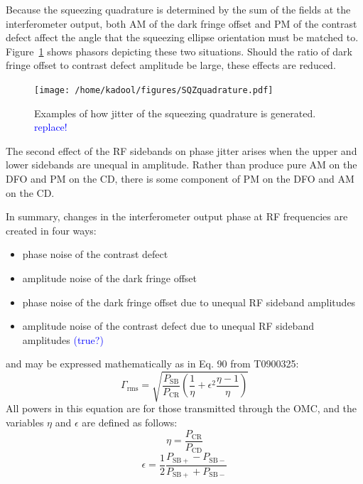 \documentclass{ligodoc}
\begin{document}
Because the squeezing quadrature is determined by the sum of the
fields at the interferometer output, both AM of the dark fringe offset
and PM of the contrast defect affect the angle that the squeezing
ellipse orientation must be matched to. Figure~\ref{fig:sqzquad} shows
phasors depicting these two situations. Should the ratio of dark
fringe offset to contrast defect amplitude be large, these effects are
reduced.

\begin{figure}
\begin{centering}
\texttt{[image: /home/kadool/figures/SQZquadrature.pdf]}
\caption{Examples of how jitter of the squeezing quadrature is
  generated. \textcolor{blue}{replace!}}
\label{fig:sqzquad}
\end{centering}
\end{figure}

The second effect of the RF sidebands on phase jitter arises when the
upper and lower sidebands are unequal in amplitude. Rather than
produce pure AM on the DFO and PM on the CD, there is some component
of PM on the DFO and AM on the CD.

In summary, changes in the interferometer output phase at RF
frequencies are created in four ways:
\begin{itemize}
\item phase noise of the contrast defect
\item amplitude noise of the dark fringe offset 
\item phase noise of the dark fringe offset due to unequal RF sideband amplitudes 
\item amplitude noise of the contrast defect due to unequal RF sideband amplitudes \textcolor{blue}{(true?)}
\end{itemize}
and may be expressed mathematically as in Eq. 90 from T0900325: 
\begin{equation}
\Gamma_{\mathrm{rms}} = \sqrt{\frac{P_{\mathrm{SB}}}{P_{\mathrm{CR}}} \left( \frac{1}{\eta} + \epsilon^2 \frac{\eta-1}{\eta} \right)}
\label{eq:Gammarms}
\end{equation}
All powers in this equation are for those transmitted through the OMC,
and the variables $\eta$ and $\epsilon$ are defined as follows:
\begin{equation}
\eta = \frac{P_{\mathrm{CR}}}{P_{\mathrm{CD}}}
\end{equation}
\begin{equation}
\epsilon = \frac{1}{2}\frac{P_{\mathrm{SB+}}-P_{\mathrm{SB-}}}{P_{\mathrm{SB+}}+P_{\mathrm{SB-}}}
\end{equation}
\end{document}
